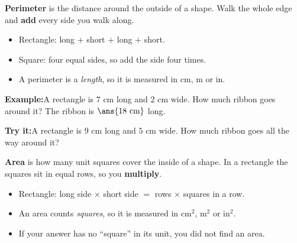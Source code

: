 \documentclass[12pt]{article}
\begin{document}


\begin{formulabox}
\textbf{Perimeter} is the distance around the outside of a shape. Walk the whole
edge and \textbf{add} every side you walk along.
\begin{itemize}[leftmargin=0.8cm, itemsep=1pt, topsep=2pt]
  \item Rectangle: long $+$ short $+$ long $+$ short.
  \item Square: four equal sides, so add the side four times.
  \item A perimeter is a \emph{length}, so it is measured in cm, m or in.
\end{itemize}
\end{formulabox}

\begin{examplebox}
\textbf{Example:}\quad A rectangle is $7$ cm long and $2$ cm wide. How much
ribbon goes around it?
The ribbon is $\ans{18\ \text{cm}}$ long.
\end{examplebox}

\begin{tryitbox}
\textbf{Try it:}\quad A rectangle is $9$ cm long and $5$ cm wide. How much ribbon
goes all the way around it?\\[2pt]
\end{tryitbox}


\begin{formulabox}
\textbf{Area} is how many unit squares cover the inside of a shape. In a
rectangle the squares sit in equal rows, so you \textbf{multiply}.
\begin{itemize}[leftmargin=0.8cm, itemsep=1pt, topsep=2pt]
  \item Rectangle: long side $\times$ short side $=$ rows $\times$ squares in a row.
  \item An area counts \emph{squares}, so it is measured in cm$^2$, m$^2$ or in$^2$.
  \item If your answer has no ``square'' in its unit, you did not find an area.
\end{itemize}
\end{formulabox}
\end{document}

